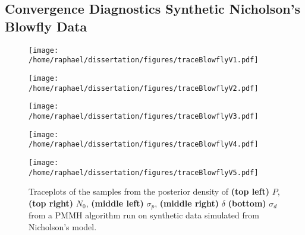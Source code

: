 \documentclass[12pt]{article}
\begin{document}
\begin{appendices}
	\subsection{Convergence Diagnostics Synthetic Nicholson's Blowfly Data}
	\begin{figure}[htb]
		\centering
		\begin{minipage}{0.49\textwidth}
			\centering
			\texttt{[image: /home/raphael/dissertation/figures/traceBlowflyV1.pdf]}
		\end{minipage}
		\begin{minipage}{0.49\textwidth}
			\centering
			\texttt{[image: /home/raphael/dissertation/figures/traceBlowflyV2.pdf]}
		\end{minipage}
		\begin{minipage}{0.49\textwidth}
			\centering
			\texttt{[image: /home/raphael/dissertation/figures/traceBlowflyV3.pdf]}
		\end{minipage}
		\begin{minipage}{0.49\textwidth}
			\centering
			\texttt{[image: /home/raphael/dissertation/figures/traceBlowflyV4.pdf]}
		\end{minipage}
		\begin{minipage}{0.49\textwidth}
			\centering
			\texttt{[image: /home/raphael/dissertation/figures/traceBlowflyV5.pdf]}
		\end{minipage}
		\caption[Traceplots of a run of a PMMH sampler run on synthetic data, Nicholson's model]{Traceplots of the samples from the posterior density of \textbf{(top left)} $P$, \textbf{(top right)} $N_0$,  \textbf{(middle left)} $\sigma_p$,  \textbf{(middle right)} $\delta$ \textbf{(bottom)} $\sigma_d$ from a PMMH algorithm run on synthetic data simulated from Nicholson's model.} 
		\label{fig:traceBlowfly}
	\end{figure}


\end{appendices}
\end{document}
